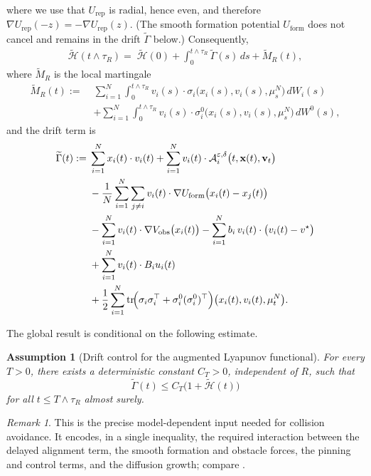 \documentclass[pdflatex,sn-mathphys-num]{sn-jnl}%
\numberwithin{equation}{section}
\theoremstyle{thmstyleone}%
\newtheorem{assumption}{Assumption}
\theoremstyle{remark}
\newtheorem{remark}{Remark}
\theoremstyle{definition}
\newcommand{\vstar}{v^{\star}}
\begin{document}
where we use that $U_{\mathrm{rep}}$ is radial, hence even, and therefore
$\nabla U_{\mathrm{rep}}(-z)=-\nabla U_{\mathrm{rep}}(z)$. (The smooth
formation potential $U_{\mathrm{form}}$ does not cancel and remains
in the drift $\widetilde\Gamma$ below.)
Consequently,
\begin{equation}\label{eq:appB-Htilde-identity}
\begin{aligned}
  \widetilde{\mathscr H}(t\wedge\tau_R)
  =\;
  \widetilde{\mathscr H}(0)
  + \int_0^{t\wedge\tau_R}\widetilde{\Gamma}(s)\,ds
  + \widetilde{M}_R(t),
\end{aligned}
\end{equation}
where $\widetilde{M}_R$ is the local martingale
\begin{equation}\label{eq:appB-mart}
\begin{aligned}
  \widetilde{M}_R(t)
  :=\;&
  \sum_{i=1}^N\int_0^{t\wedge\tau_R}
  v_i(s)\cdot
  \sigma_i\bigl(x_i(s),v_i(s),\mu_s^N\bigr)\,dW_i(s) \\
  &+ \sum_{i=1}^N\int_0^{t\wedge\tau_R}
  v_i(s)\cdot
  \sigma_i^0\bigl(x_i(s),v_i(s),\mu_s^N\bigr)\,dW^0(s),
\end{aligned}
\end{equation}
and the drift term is
\begin{equation}\label{eq:appB-drift}
\begin{aligned}
  \widetilde{\Gamma}(t)
  :=\;&
  \sum_{i=1}^N x_i(t)\cdot v_i(t) + \sum_{i=1}^N
    v_i(t)\cdot\mathcal A_i^{\varepsilon,\delta}\bigl(t,\mathbf{x}(t),\mathbf{v}_t\bigr) \\
  &- \frac1N\sum_{i=1}^N\sum_{j\neq i}
    v_i(t)\cdot\nabla U_{\mathrm{form}}\bigl(x_i(t)-x_j(t)\bigr) \\
  &- \sum_{i=1}^N
    v_i(t)\cdot\nabla V_{\mathrm{obs}}\bigl(x_i(t)\bigr) - \sum_{i=1}^N
    b_i\,v_i(t)\cdot\bigl(v_i(t)-\vstar\bigr) \\
  &+ \sum_{i=1}^N
    v_i(t)\cdot B_i u_i(t) \\
  &+ \frac12\sum_{i=1}^N
  \operatorname{tr}\!\Bigl(
    \sigma_i\sigma_i^\top+\sigma_i^0(\sigma_i^0)^\top
  \Bigr)\bigl(x_i(t),v_i(t),\mu_t^N\bigr).
\end{aligned}
\end{equation}

The global result is conditional on the following estimate.
\begin{assumption}[Drift control for the augmented Lyapunov functional]
\label{ass:appB-drift}
For every $T>0$, there exists a deterministic constant $C_T>0$,
independent of $R$, such that
\begin{equation}\label{eq:appB-drift-bound}
  \widetilde{\Gamma}(t)
  \le C_T\bigl(1+\widetilde{\mathscr H}(t)\bigr)
\end{equation}
for all $t\le T\wedge\tau_R$ almost surely.
\end{assumption}
\begin{remark}
This is the precise model-dependent input needed for collision avoidance.
It encodes, in a single inequality, the required interaction between the
delayed alignment term, the smooth formation and obstacle forces, the
pinning and control terms, and the diffusion growth; compare
\cite{khasminskii2011stochastic,mao2007stochastic}.
\end{remark}
\end{document}
